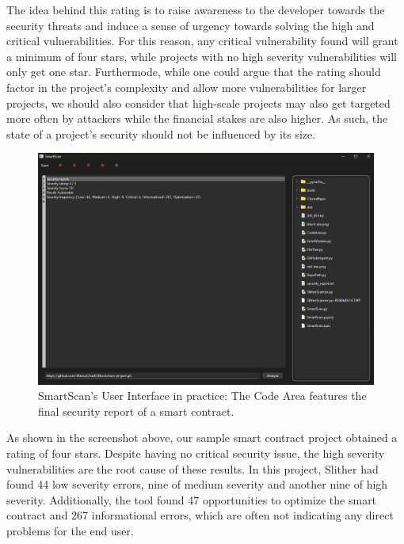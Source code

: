 The idea behind this rating is to raise awareness to the developer towards the security threats and induce a sense of urgency towards solving the high and critical vulnerabilities. For this reason, any critical vulnerability found will grant a minimum of four stars, while projects with no high severity vulnerabilities will only get one star. Furthermode, while one could argue that the rating should factor in the project's complexity and allow more vulnerabilities for larger projects, we should also consider that high-scale projects may also get targeted more often by attackers while the financial stakes are also higher. As such, the state of a project's security should not be influenced by its size.


\begin{figure}[h]
    \centering
    \includegraphics[width=1\linewidth]{images/application-design-in-practice.png}
    \caption{SmartScan's User Interface in practice: The Code Area features the final security report of a smart contract.}
    \label{fig:enter-label}
\end{figure}

As shown in the screenshot above, our sample smart contract project obtained a rating of four stars. Despite having no critical security issue, the high severity vulnerabilities are the root cause of these results. In this project, Slither had found 44 low severity errors, nine of medium severity and another nine of high severity. Additionally, the tool found 47 opportunities to optimize the smart contract and 267 informational errors, which are often not indicating any direct problems for the end user.

